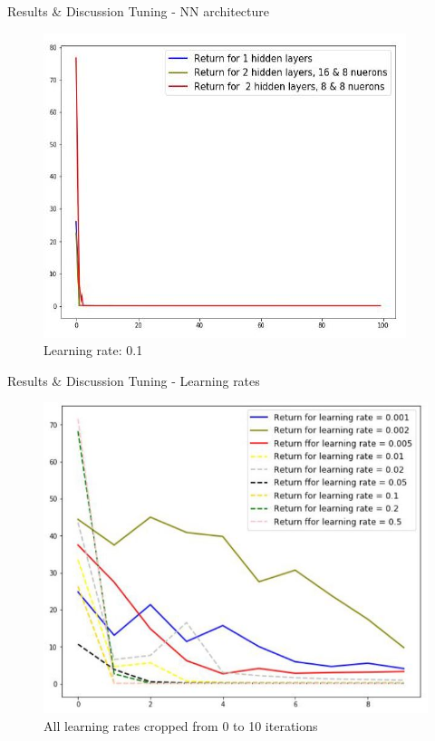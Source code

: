 \documentclass{beamer}
\begin{document}
\begin{frame}{Results \& Discussion }{Tuning - NN architecture\vphantom{(y}}
\vspace{-0.7em}
\begin{figure}
  \includegraphics[scale=0.7]{images/lr_high_a.JPG}
  \caption{Learning rate: 0.1}
\end{figure}
\end{frame}

\begin{frame}{Results \& Discussion }{Tuning - Learning rates\vphantom{(y}}
\vspace{-0.7em}
\begin{figure}
  \includegraphics[scale=0.5]{images/lr_cropped_0_10.JPG}
  \caption{All learning rates cropped from 0 to 10 iterations}
\end{figure}
\end{frame}
\end{document}
